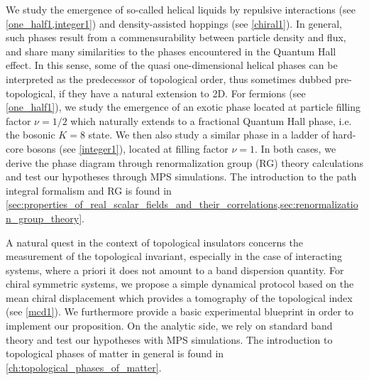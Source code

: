 We study the emergence of so-called helical liquids by repulsive interactions (see \cref{one_half1,integer1}) and density-assisted hoppings (see \cref{chiral1}).
In general, such phases result from a commensurability between particle density and flux, and share many similarities to the phases encountered in the Quantum Hall effect.
In this sense, some of the quasi one-dimensional helical phases can be interpreted as the predecessor of topological order, thus sometimes dubbed pre-topological, if they have a natural extension to 2D.
For fermions (see \cref{one_half1}), we study the emergence of an exotic phase located at particle filling factor $\nu=1/2$ which naturally extends to a fractional Quantum Hall phase, i.e. the bosonic $K=8$ state.
We then also study a similar phase in a ladder of hard-core bosons (see \cref{integer1}), located at filling factor $\nu=1$.
In both cases, we derive the phase diagram through renormalization group (RG) theory calculations and test our hypotheses through MPS simulations.
The introduction to the path integral formalism and RG is found in \cref{sec:properties_of_real_scalar_fields_and_their_correlations,sec:renormalization_group_theory}.

A natural quest in the context of topological insulators concerns the measurement of the topological invariant, especially in the case of interacting systems, where a priori it does not amount to a band dispersion quantity.
For chiral symmetric systems, we propose a simple dynamical protocol based on the mean chiral displacement which provides a tomography of the topological index (see \cref{mcd1}).
We furthermore provide a basic experimental blueprint in order to implement our proposition.
On the analytic side, we rely on standard band theory and test our hypotheses with MPS simulations.
The introduction to topological phases of matter in general is found in \cref{ch:topological_phases_of_matter}.

